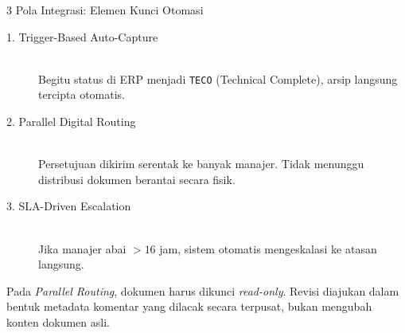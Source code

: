 \documentclass[aspectratio=169,11pt]{beamer}
\begin{document}
\begin{frame}{3 Pola Integrasi: Elemen Kunci Otomasi}
    \small
    \begin{description}
        \item[\textcolor{plnblue}{1. Trigger-Based Auto-Capture}] \hfill \\
        Begitu status di ERP menjadi \texttt{TECO} (Technical Complete), arsip langsung tercipta otomatis.
        \item[\textcolor{plncyan}{2. Parallel Digital Routing}] \hfill \\
        Persetujuan dikirim serentak ke banyak manajer. Tidak menunggu distribusi dokumen berantai secara fisik.
        \item[\textcolor{plnorange}{3. SLA-Driven Escalation}] \hfill \\
        Jika manajer abai $>16$ jam, sistem otomatis mengeskalasi ke atasan langsung.
    \end{description}
    \vspace{0.2cm}
    \begin{greenbox}
        \scriptsize Pada \textit{Parallel Routing}, dokumen harus dikunci \textit{read-only}. Revisi diajukan dalam bentuk metadata komentar yang dilacak secara terpusat, bukan mengubah konten dokumen asli.
    \end{greenbox}
\end{frame}
\end{document}
